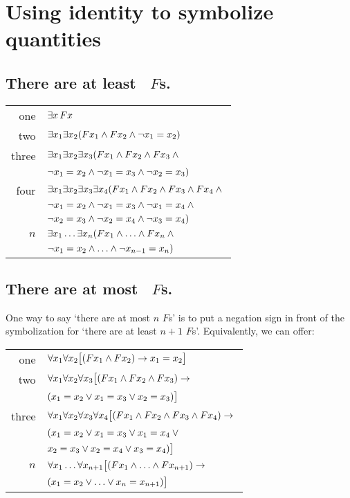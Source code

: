 \section{Using identity to symbolize quantities}

\subsection*{There are at least \blank\ $F$s.}
\label{summary.atleast}

\begin{tabular*}{\textwidth}{rl}
one & $\exists x\,\mathord{F}x$\\
two & $\exists x_1\exists x_2(\mathord{F}x_1 \wedge \mathord{F}x_2 \wedge \neg x_1  = x_2)$\\
three & $\exists x_1\exists x_2\exists x_3(\mathord{F}x_1 \wedge \mathord{F}x_2 \wedge \mathord{F}x_3 \wedge {}$\\
& $\neg x_1 = x_2 \wedge\neg x_1 = x_3 \wedge \neg x_2 = x_3)$\\
four & $\exists x_1\exists x_2\exists x_3\exists x_4 (\mathord{F}x_1 \wedge \mathord{F}x_2 \wedge \mathord{F}x_3 \wedge \mathord{F}x_4 \wedge {}$\\
& $\neg x_1 = x_2 \wedge \neg x_1 = x_3 \wedge \neg x_1 = x_4 \wedge {}$\\
& $ \neg x_2 = x_3 \wedge \neg x_2 = x_4 \wedge \neg x_3 = x_4)$\\
$n$ & $\exists x_1\ldots\exists x_n(\mathord{F}x_1 \wedge \ldots \wedge \mathord{F}x_n \wedge {}$\\
& $\neg x_1 = x_2 \wedge\ldots\wedge \neg x_{n-1} = x_n)$ 
\end{tabular*}

\subsection*{There are at most \blank\ $F$s.}
\label{summary.atmost}

One way to say `there are at most $n$ $F$s' is to put a negation sign in front of the symbolization for `there are at least $n+1$ $F$s'. Equivalently, we can offer:
\begin{tabular*}{\textwidth}{rl}
one & $\forall x_1\forall x_2\bigl[(\mathord{F}x_1 \wedge \mathord{F}x_2) \rightarrow x_1=x_2\bigr]$\\
two & $\forall x_1\forall x_2\forall x_3\bigl[(\mathord{F}x_1 \wedge \mathord{F}x_2 \wedge \mathord{F}x_3) \rightarrow {}$\\ & $(x_1=x_2 \vee x_1=x_3 \vee x_2=x_3)\bigr]$\\
three & $\forall x_1\forall x_2\forall x_3\forall x_4\bigl[(\mathord{F}x_1 \wedge \mathord{F}x_2 \wedge \mathord{F}x_3 \wedge \mathord{F}x_4) \rightarrow {}$\\
& $(x_1=x_2 \vee x_1=x_3 \vee x_1=x_4 \vee {}$\\
& $x_2=x_3 \vee x_2=x_4 \vee x_3=x_4)\bigr]$\\
$n$ & $\forall x_1\ldots\forall x_{n+1}
\bigl[(\mathord{F}x_1 \wedge \ldots \wedge \mathord{F}x_{n+1}) \rightarrow {}$\\
& $(x_1=x_2 \vee \ldots \vee x_n=x_{n+1})\bigr]$ 
\end{tabular*}

